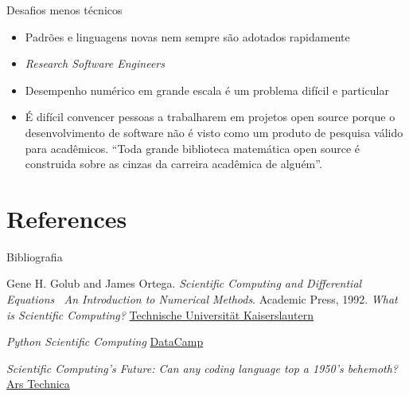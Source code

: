 \documentclass{beamer}
\begin{document}
\begin{darkframes}
  \begin{frame}{Desafios menos técnicos}
    \begin{itemize}
    \item<1-> Padrões e linguagens novas nem sempre são adotados rapidamente
    \item<2-> \emph{Research Software Engineers}%
    \item<3-> Desempenho numérico em grande escala é um problema difícil e particular %
    \item<4-> É difícil convencer pessoas a trabalharem em projetos open source porque o desenvolvimento de software não é visto como um produto de pesquisa válido para acadêmicos. ``Toda grande biblioteca matemática open source é construida sobre as cinzas da carreira acadêmica de alguém''.
    \end{itemize}
  \end{frame}
  
  \section{References}
  \begin{frame}[label=bibliography, allowframebreaks]{Bibliografia}
    \scriptsize{%
    \begin{thebibliography}{99}
      Gene H. Golub and James Ortega. \emph{Scientific Computing and Differential Equations \textemdash\ An Introduction to Numerical Methods}. Academic Press, 1992.
     \emph{What is Scientific Computing?} \hyperlink{https://www.scicomp.uni-kl.de/about/scientific-computing/}{Technische Universität Kaiserslautern}
      
     \emph{Python Scientific Computing} \hyperlink{https://www.datacamp.com/community/blog/python-scientific-computing-case}{DataCamp}
       
     \emph{Scientific Computing's Future: Can any coding language top a 1950's behemoth?} \hyperlink{https://arstechnica.com/science/2014/05/scientific-computings-future-can-any-coding-language-top-a-1950s-behemoth/}{Ars Technica}
    

\end{thebibliography}}
\end{frame}
\end{darkframes}
\end{document}
